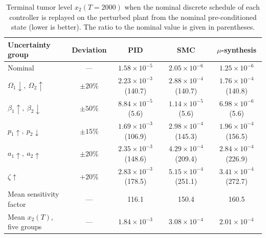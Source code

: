 \begin{table}[htbp]
\centering
\caption{Terminal tumor level $x_2(T=2000)$ when the nominal discrete schedule of each controller is replayed on the perturbed plant from the nominal pre-conditioned state (lower is better). The ratio to the nominal value is given in parentheses.}
\label{tab:uncertainty_consolidated_short}
\begin{tabular}{lcccc}
\toprule
Uncertainty group & Deviation & PID & SMC & $\mu$-synthesis \\
\midrule
Nominal & --- & $1.58{\times}10^{-5}$ & $2.05{\times}10^{-6}$ & $1.25{\times}10^{-6}$ \\
$\Omega_1 \downarrow,\ \Omega_2 \uparrow$ & $\pm 20\%$ & $2.23{\times}10^{-3}$ (140.7) & $2.88{\times}10^{-4}$ (140.7) & $1.76{\times}10^{-4}$ (140.8) \\
$\beta_1 \uparrow,\ \beta_2 \downarrow$ & $\pm 50\%$ & $8.84{\times}10^{-5}$ (5.6) & $1.14{\times}10^{-5}$ (5.6) & $6.98{\times}10^{-6}$ (5.6) \\
$p_1 \uparrow,\ p_2 \downarrow$ & $\pm 15\%$ & $1.69{\times}10^{-3}$ (106.9) & $2.98{\times}10^{-4}$ (145.3) & $1.96{\times}10^{-4}$ (156.5) \\
$a_1 \uparrow,\ a_2 \uparrow$ & $\pm 20\%$ & $2.35{\times}10^{-3}$ (148.6) & $4.29{\times}10^{-4}$ (209.4) & $2.84{\times}10^{-4}$ (226.9) \\
$\zeta \uparrow$ & $+20\%$ & $2.83{\times}10^{-3}$ (178.5) & $5.15{\times}10^{-4}$ (251.1) & $3.41{\times}10^{-4}$ (272.7) \\
\midrule
Mean sensitivity factor & --- & 116.1 & 150.4 & 160.5 \\
Mean $x_2(T)$, five groups & --- & $1.84{\times}10^{-3}$ & $3.08{\times}10^{-4}$ & $2.01{\times}10^{-4}$ \\
\bottomrule
\end{tabular}
\end{table}
